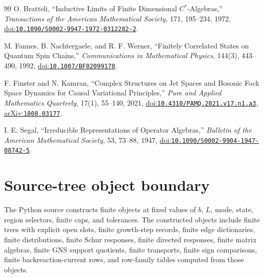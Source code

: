 \documentclass[11pt]{article}
\theoremstyle{remark}
\newcommand{\doi}[1]{\href{https://doi.org/#1}{doi:\nolinkurl{#1}}}
\newcommand{\arxivref}[1]{\href{https://arxiv.org/abs/#1}{arXiv:\nolinkurl{#1}}}
\numberwithin{equation}{section}
\begin{document}
\begin{thebibliography}{99}
O. Bratteli,
``Inductive Limits of Finite Dimensional $C^*$-Algebras,''
\emph{Transactions of the American Mathematical Society},
171, 195--234, 1972,
\doi{10.1090/S0002-9947-1972-0312282-2}.

M. Fannes, B. Nachtergaele, and R. F. Werner,
``Finitely Correlated States on Quantum Spin Chains,''
\emph{Communications in Mathematical Physics},
144(3), 443--490, 1992,
\doi{10.1007/BF02099178}.

F. Finster and N. Kamran,
``Complex Structures on Jet Spaces and Bosonic Fock Space Dynamics for Causal Variational Principles,''
\emph{Pure and Applied Mathematics Quarterly},
17(1), 55--140, 2021,
\doi{10.4310/PAMQ.2021.v17.n1.a3},
\arxivref{1808.03177}.

I. E. Segal,
``Irreducible Representations of Operator Algebras,''
\emph{Bulletin of the American Mathematical Society},
53, 73--88, 1947,
\doi{10.1090/S0002-9904-1947-08742-5}.

\end{thebibliography}

\section{Source-tree object boundary}
The Python source constructs finite objects at fixed values of $b$, $L$, mode, state, region selectors, finite caps, and tolerances. The constructed objects include finite trees with explicit open slots, finite growth-step records, finite edge dictionaries, finite distributions, finite Schur responses, finite directed responses, finite matrix algebras, finite GNS support quotients, finite transports, finite sign comparisons, finite backreaction-current rows, and row-family tables computed from those objects.
\end{document}
